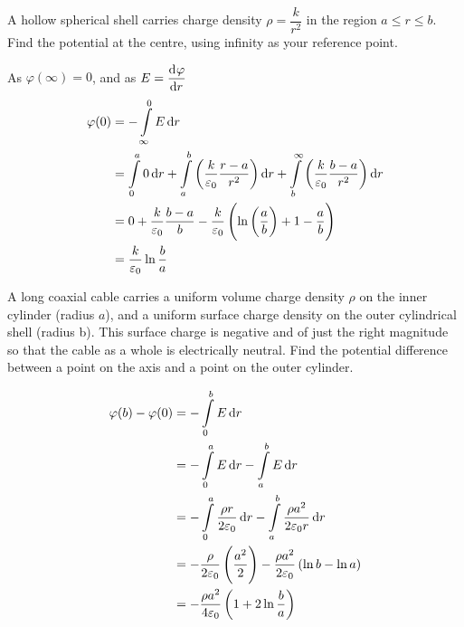 \documentclass[fleqn, a4paper, 12pt, oneside]{amsart}
\theoremstyle{definition}
\theoremstyle{theorem}
\begin{document}
\begin{question}
	A hollow spherical shell carries charge density $\rho = \dfrac{k}{r^2}$ in the region $a \le r \le b$.
	Find the potential at the centre, using infinity as your reference point.
	\begin{figure}[H]
	\end{figure}
\end{question}

\begin{solution}
	As $\varphi(\infty) = 0$, and as $E = \dod{\varphi}{r}$
	\begin{align*}
		\varphi(0) &= -\int\limits_{\infty}^{0} E \dif r\\
		&= \int\limits_{0}^{a} 0 \dif r + \int\limits_{a}^{b} \left( \dfrac{k}{\varepsilon_0} \dfrac{r - a}{r^2} \right) \dif r + \int\limits_{b}^{\infty} \left( \dfrac{k}{\varepsilon_0} \dfrac{b - a}{r^2} \right) \dif r\\
		&= 0 + \dfrac{k}{\varepsilon_0} \dfrac{b - a}{b} - \dfrac{k}{\varepsilon_0} \left( \ln \left( \dfrac{a}{b} \right) + 1 - \dfrac{a}{b} \right)\\
		&= \dfrac{k}{\varepsilon_0} \ln \dfrac{b}{a}
	\end{align*}
\end{solution}

\begin{question}
	A long coaxial cable carries a uniform volume charge density $\rho$ on the inner cylinder (radius $a$), and a uniform surface charge density on the outer cylindrical shell (radius b).
	This surface charge is negative and of just the right magnitude so that the cable as a whole is electrically neutral.
	Find the potential difference between a point on the axis and a point on the outer cylinder.
\end{question}

\begin{solution}
	\begin{align*}
		\varphi(b) - \varphi(0) &= -\int\limits_{0}^{b} E \dif r\\
		&= -\int\limits_{0}^{a} E \dif r - \int\limits_{a}^{b} E \dif r\\
		&= -\int\limits_{0}^{a} \dfrac{\rho r}{2 \varepsilon_0} \dif r - \int\limits_{a}^{b} \dfrac{\rho a^2}{2 \varepsilon_0 r} \dif r\\
		&= -\dfrac{\rho}{2 \varepsilon_0} \left( \dfrac{a^2}{2} \right) - \dfrac{\rho a^2}{2 \varepsilon_0} \left( \ln b - \ln a \right)\\
		&= -\dfrac{\rho a^2}{4 \varepsilon_0} \left( 1 + 2 \ln \dfrac{b}{a} \right)
	\end{align*}
\end{solution}
\end{document}
